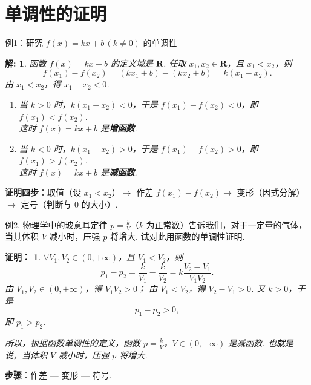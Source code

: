 \documentclass[aspectratio=169,13pt,t] {beamer}
\newtheorem*{prooft}{证明：}
\newtheorem*{solve}{解:}
\theoremstyle{definition}
\begin{document}
\section{单调性的证明}

\begin{frame}{例1：研究 \(f(x)=kx+b\,(k\neq 0)\) 的单调性}
	
	\pause\vspace{-1em}
	\begin{solve}
	\pause
	函数 \(f(x)=kx+b\) 的定义域是 \(\mathbf{R}\). 任取 \(x_1,x_2\in\mathbf{R}\)，且 \(x_1<x_2\)，则
	\[
		f(x_1)-f(x_2)=(kx_1+b)-(kx_2+b)=k(x_1-x_2).
	\]
	由 \(x_1<x_2\)，得 \(x_1-x_2<0\).
	\begin{enumerate}[(1)]
	\item<4-> 当 \(k>0\) 时，\(k(x_1-x_2)<0\)，于是 \(f(x_1)-f(x_2)<0\)，即 \(f(x_1)<f(x_2)\).\\
	\quad 这时 \(f(x)=kx+b\) 是\textbf{增函数}.
	\item<5-> 当 \(k<0\) 时，\(k(x_1-x_2)>0\)，于是 \(f(x_1)-f(x_2)>0\)，即 \(f(x_1)>f(x_2)\).\\
	\quad 这时 \(f(x)=kx+b\) 是\textbf{减函数}.
	\end{enumerate}
	\end{solve}
	
	\pause\pause\pause
	\begin{summarybox-answer}
		\textbf{证明四步}：取值（设 \(x_1<x_2\)）\(\to\) 作差 \(f(x_1)-f(x_2)\)\(\to\) 变形（因式分解）\(\to\) 定号（判断与 \(0\) 的大小）.
	\end{summarybox-answer}
\end{frame}

\begin{frame}{例2. 物理学中的玻意耳定律 \(p=\frac{k}{V}\)（\(k\) 为正常数）告诉我们，对于一定量的气体，当其体积 \(V\) 减小时，压强 \(p\) 将增大. 试对此用函数的单调性证明.}
	
\vspace{-2em}
	\begin{prooft}
	\pause
	 \(\forall V_1, V_2 \in (0, +\infty)\)，且 \(V_1 < V_2\)，则
	\[
	p_1 - p_2 = \frac{k}{V_1} - \frac{k}{V_2} = k\frac{V_2 - V_1}{V_1V_2}.
	\]
	\pause
	由 \(V_1, V_2 \in (0, +\infty)\)，得 \(V_1V_2 > 0\)；
	由 \(V_1 < V_2\)，得 \(V_2 - V_1 > 0\).
	又 \(k > 0\)，于是
	\[
	p_1 - p_2 > 0,
	\]
	即
	$p_1 > p_2.$
	
	\pause
	所以，根据函数单调性的定义，函数 \(p=\frac{k}{V}\)，\(V \in (0, +\infty)\) 是减函数. 也就是说，当体积 \(V\) 减小时，压强 \(p\) 将增大.
\end{prooft}

	\pause\vspace{-1em}
\begin{summarybox-answer}
	\textbf{步骤}：作差 --- 变形 --- 符号.
\end{summarybox-answer}
\end{frame}
\end{document}
